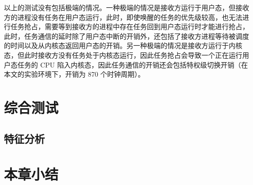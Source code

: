 以上的测试没有包括极端的情况。一种极端的情况是接收方运行于用户态，但接收方的进程没有任务在用户态运行，此时，即使唤醒的任务的优先级较高，也无法进行任务抢占，需要等到接收方的进程中存在任务回到用户态运行时才能进行抢占，此时，任务通信的延时除了用户态中断的开销外，还包括了接收方进程等待被调度的时间以及从内核态返回用户态的开销。另一种极端的情况是接收方运行于内核态，但此时接收方没有任务处于内核态运行，因此任务抢占会导致一个正在运行用户态任务的 CPU 陷入内核态，因此任务通信的开销还会包括特权级切换开销（在本文的实验环境下，开销为 870 个时钟周期）。

\section{综合测试}

\subsection{特征分析}

\section{本章小结}




